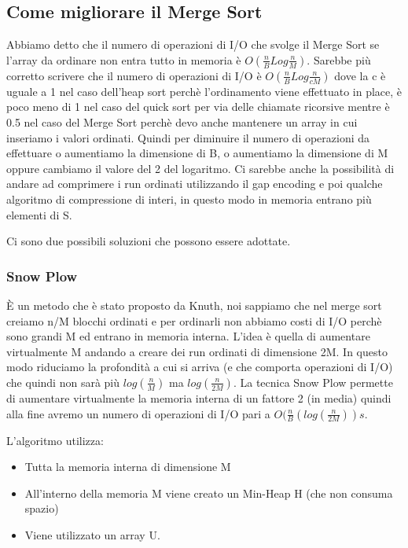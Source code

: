 \documentclass[14pt]{extreport}
\begin{document}
\subsection{Come migliorare il Merge Sort}

Abbiamo detto che il numero di operazioni di I/O che svolge il Merge Sort se l'array da ordinare non entra tutto in memoria è $O(\frac{n}{B}Log\frac{n}{M})$.
Sarebbe più corretto scrivere che il numero di operazioni di I/O è $O(\frac{n}{B}Log\frac{n}{cM})$ dove la c è uguale a 1 nel caso dell'heap sort perchè l'ordinamento viene effettuato in place, è poco meno di 1 nel caso del quick sort per via delle chiamate ricorsive mentre è 0.5 nel caso del Merge Sort perchè devo anche mantenere un array in cui inseriamo i valori ordinati.
Quindi per diminuire il numero di operazioni da effettuare o aumentiamo la dimensione di B, o aumentiamo la dimensione di M oppure cambiamo il valore del 2 del logaritmo.
Ci sarebbe anche la possibilità di andare ad comprimere i run ordinati utilizzando il gap encoding e poi qualche algoritmo di compressione di interi, in questo modo in memoria entrano più elementi di S.

Ci sono due possibili soluzioni che possono essere adottate.

\subsubsection{Snow Plow}

È un metodo che è stato proposto da Knuth, noi sappiamo che nel merge sort creiamo n/M blocchi ordinati e per ordinarli non abbiamo costi di I/O perchè sono grandi M ed entrano in memoria interna.
L'idea è quella di aumentare virtualmente M andando a creare dei run ordinati di dimensione 2M. In questo modo riduciamo la profondità a cui si arriva (e che comporta operazioni di I/O) che quindi non sarà più $log(\frac{n}{M})$ ma $log(\frac{n}{2M})$.
La tecnica Snow Plow permette di aumentare virtualmente la memoria interna di un fattore 2 (in media) quindi alla fine avremo un numero di operazioni di I/O pari a $O(\frac{n}{B}(log(\frac{n}{2M}))s$.

L'algoritmo utilizza:
\begin{itemize}
    \item Tutta la memoria interna di dimensione M
    \item All'interno della memoria M viene creato un Min-Heap H (che non consuma spazio)
    \item Viene utilizzato un array U.
\end{itemize}
\end{document}
